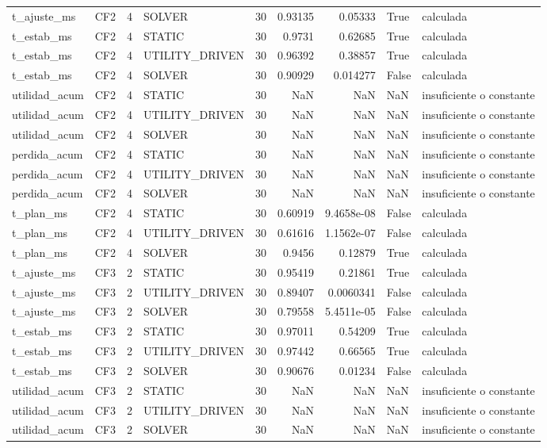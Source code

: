 \begin{tabular}{llrlrrrll}
t_ajuste_ms & CF2 & 4 & SOLVER & 30 & 0.93135 & 0.05333 & True & calculada \\
t_estab_ms & CF2 & 4 & STATIC & 30 & 0.9731 & 0.62685 & True & calculada \\
t_estab_ms & CF2 & 4 & UTILITY_DRIVEN & 30 & 0.96392 & 0.38857 & True & calculada \\
t_estab_ms & CF2 & 4 & SOLVER & 30 & 0.90929 & 0.014277 & False & calculada \\
utilidad_acum & CF2 & 4 & STATIC & 30 & NaN & NaN & NaN & insuficiente o constante \\
utilidad_acum & CF2 & 4 & UTILITY_DRIVEN & 30 & NaN & NaN & NaN & insuficiente o constante \\
utilidad_acum & CF2 & 4 & SOLVER & 30 & NaN & NaN & NaN & insuficiente o constante \\
perdida_acum & CF2 & 4 & STATIC & 30 & NaN & NaN & NaN & insuficiente o constante \\
perdida_acum & CF2 & 4 & UTILITY_DRIVEN & 30 & NaN & NaN & NaN & insuficiente o constante \\
perdida_acum & CF2 & 4 & SOLVER & 30 & NaN & NaN & NaN & insuficiente o constante \\
t_plan_ms & CF2 & 4 & STATIC & 30 & 0.60919 & 9.4658e-08 & False & calculada \\
t_plan_ms & CF2 & 4 & UTILITY_DRIVEN & 30 & 0.61616 & 1.1562e-07 & False & calculada \\
t_plan_ms & CF2 & 4 & SOLVER & 30 & 0.9456 & 0.12879 & True & calculada \\
t_ajuste_ms & CF3 & 2 & STATIC & 30 & 0.95419 & 0.21861 & True & calculada \\
t_ajuste_ms & CF3 & 2 & UTILITY_DRIVEN & 30 & 0.89407 & 0.0060341 & False & calculada \\
t_ajuste_ms & CF3 & 2 & SOLVER & 30 & 0.79558 & 5.4511e-05 & False & calculada \\
t_estab_ms & CF3 & 2 & STATIC & 30 & 0.97011 & 0.54209 & True & calculada \\
t_estab_ms & CF3 & 2 & UTILITY_DRIVEN & 30 & 0.97442 & 0.66565 & True & calculada \\
t_estab_ms & CF3 & 2 & SOLVER & 30 & 0.90676 & 0.01234 & False & calculada \\
utilidad_acum & CF3 & 2 & STATIC & 30 & NaN & NaN & NaN & insuficiente o constante \\
utilidad_acum & CF3 & 2 & UTILITY_DRIVEN & 30 & NaN & NaN & NaN & insuficiente o constante \\
utilidad_acum & CF3 & 2 & SOLVER & 30 & NaN & NaN & NaN & insuficiente o constante \\

\end{tabular}
